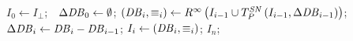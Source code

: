 \begin{algorithm}
    \caption{The \seminaive evaluation of an \egglog program.}
    \label{alg:eval}
    \begin{algorithmic}
        \State $I_0\gets I_\bot$;\ \ $\Delta\mathit{DB}{}_0\gets \emptyset$;
            \State $\left(\mathit{DB}_i{},\equiv_i\right) \gets R^\infty\left(
                I_{i-1}\cup T^{\mathit{SN}}_P\left(
                    I_{i-1}, \Delta\mathit{DB}_{i-1}
                \right)
            \right)$;
            \State $\Delta\mathit{DB}{}_i \gets \mathit{DB}{}_{i} - \mathit{DB}{}_{i-1}$;
            \State $I_i\gets \left(\mathit{DB}_i{},\equiv_i\right)$;
        \EndFor
        \State \Return $I_n$;
    \EndProcedure
    \end{algorithmic}
\end{algorithm}




